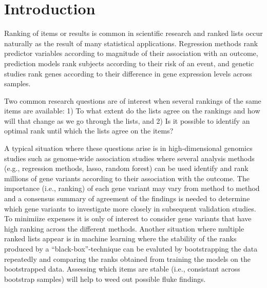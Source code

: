 \documentclass[oupdraft]{bio}
\newcommand{\added}[1]{{\color{added}{}#1}}
\begin{document}

\section{Introduction}

Ranking of items or results is common in scientific research and
ranked lists occur naturally as the result of many statistical
applications. Regression methods rank predictor variables according to
magnitude of their association with an outcome, prediction models rank
subjects according to their risk of an event, and genetic studies rank
genes according to their difference in gene expression levels across
samples.  \added{Two common research questions are of interest when
  several rankings of the same items are available: 1) To what extent
  do the lists agree on the rankings and how will that change as we go
  through the lists, and 2) Is it possible to identify an optimal rank
  until which the lists agree on the items?

  A typical situation where
  these questions arise is in high-dimensional genomics studies such
  as genome-wide association studies where several analysis methods
  (e.g., regression methods, lasso, random forest) can be used
  identify and rank millions of gene variants according to their
  association with the outcome. The importance (i.e., ranking) of each
  gene variant may vary from method to method and a consensus summary
  of agreement of the findings is needed to determine which gene
  variants to investigate more closely in subsequent validation
  studies. To minimiize expenses it is only of interest to consider
  gene variants that have high ranking across the different methods.
  Another situation where multiple ranked lists appear is in machine
  learning where the stability of the ranks produced by a
  ``black-box''-technique can be evaluted by bootstrapping the data
  repeatedly and comparing the ranks obtained from training the models
  on the bootstrapped data. Assessing which items are stable (i.e.,
  consistant across bootstrap samples) will help to weed out possible
  fluke findings.}
\end{document}
